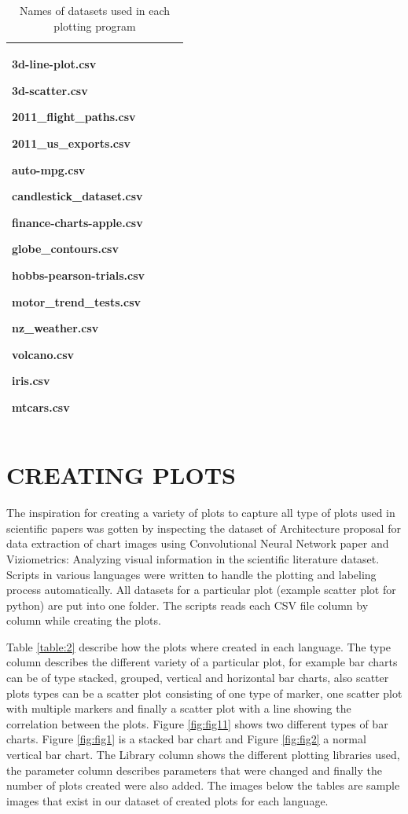 \documentclass[12pt, a4paper,oneside]{report}
\begin{document}
\begin{table}[h]
\begin{tabular}{|p{5cm}|p{3cm}|p{3cm}|p{4cm}|}
		3d-line-plot.csv \par 3d-scatter.csv \par 2011\_flight\_paths.csv \par 2011\_us\_exports.csv \par auto-mpg.csv \par candlestick\_dataset.csv \par finance-charts-apple.csv \par 
		globe\_contours.csv\par hobbs-pearson-trials.csv \par motor\_trend\_tests.csv \par 
		nz\_weather.csv \par volcano.csv \par iris.csv \par mtcars.csv	\\ \hline
		
	\end{tabular}
	\caption {Names of datasets used in each plotting program}	
	\label{table:1}
\end{table}


\chapter{CREATING PLOTS}
The inspiration for creating a variety of plots to capture all type of plots used in scientific papers was gotten by inspecting the dataset of Architecture proposal for data extraction of chart images using Convolutional Neural Network paper \cite{junior2017architecture} and Viziometrics: Analyzing visual information in the scientific literature \cite{lee2018viziometrics} dataset. Scripts in various languages were written to handle the plotting and labeling process automatically. All datasets for a particular plot (example scatter plot for python) are put into one folder. The scripts reads each CSV file column by column while creating the plots.
 
Table \ref{table:2} describe how the plots where created in each language. The type column describes the different variety of a particular plot, for example bar charts can be of type stacked, grouped, vertical and horizontal bar charts, also scatter plots types can be a scatter plot consisting of one type of marker, one scatter plot with multiple markers and finally a scatter plot with a line showing the correlation between the plots. 
Figure \ref{fig:fig11} shows two different types of bar charts. Figure \ref{fig:fig1} is a stacked bar chart and  Figure \ref{fig:fig2} a normal vertical bar chart.
The Library column shows the different plotting libraries used, the parameter column describes parameters that were changed and finally the number of plots created were also added. The images below the tables are sample images that exist in our dataset of created plots for each language.
\end{document}
